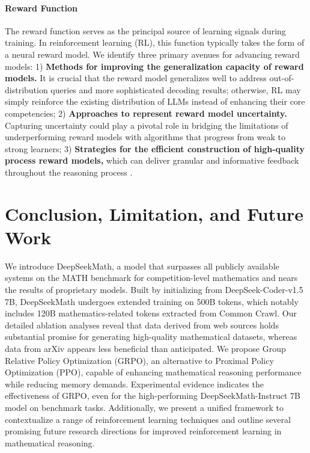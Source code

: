 \begin{itemize}[topsep=0pt]
\begin{itemize}[topsep=0pt]
\paragraph{Reward Function} The reward function serves as the principal source of learning signals during training. In reinforcement learning (RL), this function typically takes the form of a neural reward model. We identify three primary avenues for advancing reward models: 1) \textbf{Methods for improving the generalization capacity of reward models.} It is crucial that the reward model generalizes well to address out-of-distribution queries and more sophisticated decoding results; otherwise, RL may simply reinforce the existing distribution of LLMs instead of enhancing their core competencies; 2) \textbf{Approaches to represent reward model uncertainty.} Capturing uncertainty could play a pivotal role in bridging the limitations of underperforming reward models with algorithms that progress from weak to strong learners; 3) \textbf{Strategies for the efficient construction of high-quality process reward models,} which can deliver granular and informative feedback throughout the reasoning process \citep{lightman2023let,wang2023math}.

\section{Conclusion, Limitation, and Future Work}  
We introduce DeepSeekMath, a model that surpasses all publicly available systems on the MATH benchmark for competition-level mathematics and nears the results of proprietary models. Built by initializing from DeepSeek-Coder-v1.5 7B, DeepSeekMath undergoes extended training on 500B tokens, which notably includes 120B mathematics-related tokens extracted from Common Crawl. Our detailed ablation analyses reveal that data derived from web sources holds substantial promise for generating high-quality mathematical datasets, whereas data from arXiv appears less beneficial than anticipated. We propose Group Relative Policy Optimization (GRPO), an alternative to Proximal Policy Optimization (PPO), capable of enhancing mathematical reasoning performance while reducing memory demands. Experimental evidence indicates the effectiveness of GRPO, even for the high-performing DeepSeekMath-Instruct 7B model on benchmark tasks. Additionally, we present a unified framework to contextualize a range of reinforcement learning techniques and outline several promising future research directions for improved reinforcement learning in mathematical reasoning.


\end{itemize}
\end{itemize}

